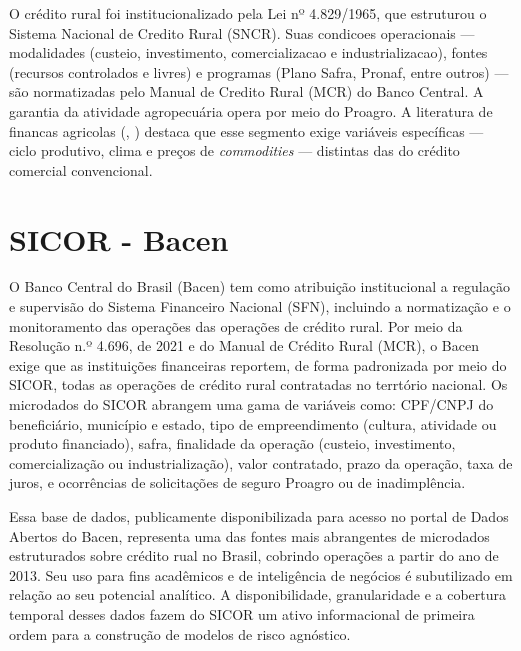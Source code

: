 O crédito rural foi institucionalizado pela Lei nº 4.829/1965, que estruturou o Sistema Nacional de Credito Rural (SNCR). Suas condicoes operacionais — modalidades (custeio, investimento, comercializacao e industrializacao), fontes (recursos controlados e livres) e programas (Plano Safra, Pronaf, entre outros) — são normatizadas pelo Manual de Credito Rural (MCR) do Banco Central. A garantia da atividade agropecuária opera por meio do Proagro. A literatura de financas agricolas (\cite{barry&ellinger2011}, \cite{turvey1991}) destaca que esse segmento exige variáveis específicas — ciclo produtivo, clima e preços de \textit{commodities} — distintas das do crédito comercial convencional.

\section{SICOR - Bacen}

O Banco Central do Brasil (Bacen) tem como atribuição institucional a regulação e supervisão do Sistema Financeiro Nacional (SFN), incluindo a normatização e o monitoramento das operações das operações de crédito rural. Por meio da Resolução n.º 4.696, de 2021 e do Manual de Crédito Rural (MCR), o Bacen exige que as instituições financeiras reportem, de forma padronizada por meio do SICOR, todas as operações de crédito rural contratadas no terrtório nacional. Os microdados do SICOR abrangem uma gama de variáveis como: CPF/CNPJ do beneficiário, município e estado, tipo de empreendimento (cultura, atividade ou produto financiado), safra, finalidade da operação (custeio, investimento, comercialização ou industrialização), valor contratado, prazo da operação, taxa de juros, e ocorrências de solicitações de seguro Proagro ou de inadimplência.

Essa base de dados, publicamente disponibilizada  para acesso no portal de Dados Abertos do Bacen, representa uma das fontes mais abrangentes de microdados estruturados sobre crédito rual no Brasil, cobrindo operações a partir do ano de 2013. Seu uso para fins acadêmicos e de inteligência de negócios é subutilizado em relação ao seu potencial analítico. A disponibilidade, granularidade e a cobertura temporal desses dados fazem do SICOR um ativo informacional de primeira ordem para a construção de modelos de risco agnóstico.
